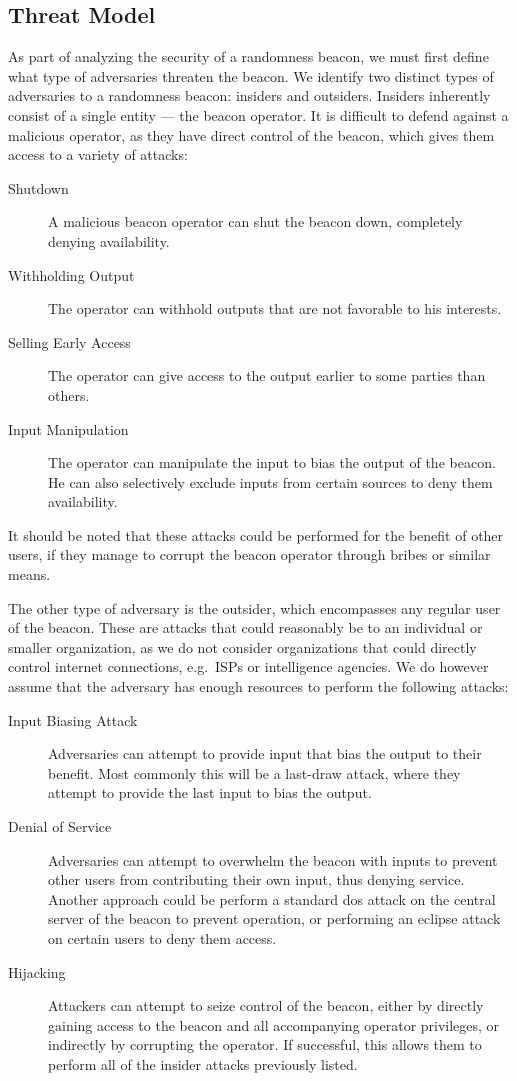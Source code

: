 \subsection{Threat Model}
As part of analyzing the security of a randomness beacon, we must first define what type of adversaries threaten the beacon. We identify two distinct types of adversaries to a randomness beacon: insiders and outsiders. Insiders inherently consist of a single entity --- the beacon operator. It is difficult to defend against a malicious operator, as they have direct control of the beacon, which gives them access to a variety of attacks:

\begin{description}
    \item [Shutdown] A malicious beacon operator can shut the beacon down, completely denying availability.
    \item [Withholding Output] The operator can withhold outputs that are not favorable to his interests.
    \item [Selling Early Access] The operator can give access to the output earlier to some parties than others.
    \item [Input Manipulation] The operator can manipulate the input to bias the output of the beacon. He can also selectively exclude inputs from certain sources to deny them availability.

\end{description}

It should be noted that these attacks could be performed for the benefit of other users, if they manage to corrupt the beacon operator through bribes or similar means.

The other type of adversary is the outsider, which encompasses any regular user of the beacon. These are attacks that could reasonably be to an individual or smaller organization, as we do not consider organizations that could directly control internet connections, e.g.\ ISPs or intelligence agencies. We do however assume that the adversary has enough resources to perform the following attacks:

\begin{description}
    \item [Input Biasing Attack] Adversaries can attempt to provide input that bias the output to their benefit. Most commonly this will be a last-draw attack, where they attempt to provide the last input to bias the output. 
    \item [Denial of Service] Adversaries can attempt to overwhelm the beacon with inputs to prevent other users from contributing their own input, thus denying service. Another approach could be perform a standard \gls{dos} attack on the central server of the beacon to prevent operation, or performing an eclipse attack on certain users to deny them access. 
    \item [Hijacking] Attackers can attempt to seize control of the beacon, either by directly gaining access to the beacon and all accompanying operator privileges, or indirectly by corrupting the operator. If successful, this allows them to perform all of the insider attacks previously listed.  
\end{description}



